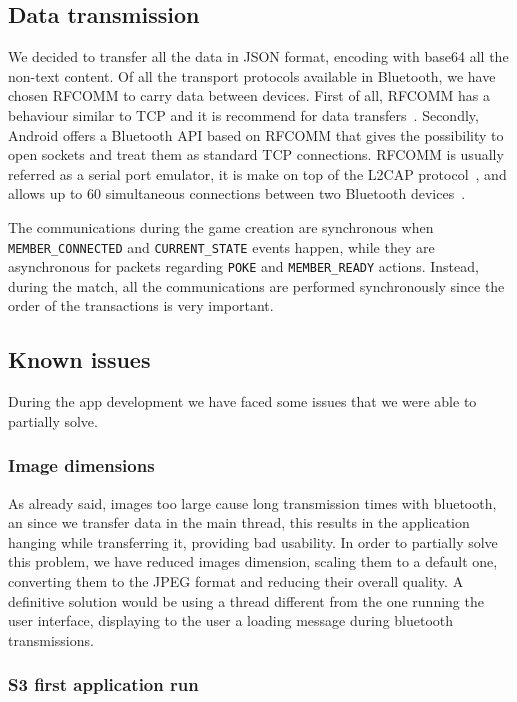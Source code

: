 \subsection{Data transmission}

We decided to transfer all the data in JSON format, encoding with base64 all the
non-text content.
Of all the transport protocols available in Bluetooth, we have chosen RFCOMM to 
carry data between devices. First of all, RFCOMM has a behaviour similar to TCP 
and it is recommend for data transfers~\cite{bisdikian01}. Secondly, Android 
offers a Bluetooth API based on RFCOMM that gives the possibility to open 
sockets and treat them as standard TCP connections.
RFCOMM is usually referred as a serial port emulator, it is make on top of 
the L2CAP protocol~\cite{bisdikian01}, and allows up to 60 simultaneous 
connections between two Bluetooth devices~\cite{aneesh12}.

The communications during the game creation are synchronous when 
\texttt{MEMBER\_CONNECTED} and \texttt{CURRENT\_STATE} events happen, while 
they are asynchronous for packets regarding \texttt{POKE} 
and \texttt{MEMBER\_READY} actions. Instead, during the match, all the 
communications are performed synchronously since the order of the transactions 
is very important.

\subsection{Known issues}

During the app development we have faced some issues that we were able to 
partially solve.

\subsubsection{Image dimensions}

As already said, images too large cause long transmission times with bluetooth, 
an since we transfer data  in the main thread, this results in the application 
hanging while transferring it, providing bad usability. In order to partially 
solve this problem, we have reduced images dimension, scaling them to a default 
one, converting them to the JPEG format and reducing their overall quality. A 
definitive solution would be using a thread different from the one running the 
user interface, displaying to the user a loading message during bluetooth 
transmissions.

\subsubsection{S3 first application run}

